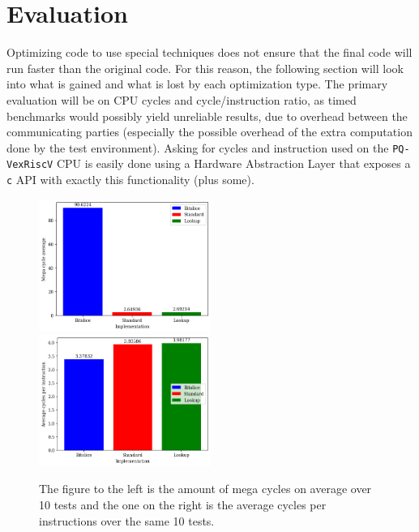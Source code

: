 \section{Evaluation} \label{evalsec}
Optimizing code to use special techniques does not ensure that the final code will run faster than the original code. For this reason, the following section will look into what is gained and what is lost by each optimization type. The primary evaluation will be on CPU cycles and cycle/instruction ratio, as timed benchmarks would possibly yield unreliable results, due to overhead between the communicating parties (especially the possible overhead of the extra computation done by the test environment). Asking for cycles and instruction used on the \texttt{PQ-VexRiscV} CPU is easily done using a Hardware Abstraction Layer that exposes a \texttt{c} API with exactly this functionality (plus some).
\begin{figure}[t]
    \includegraphics[width=0.5\textwidth]{resources/bar_avg_cycle.png}
    \includegraphics[width=0.5\textwidth]{resources/bar_avg_ratio.png}
    \caption{The figure to the left is the amount of mega cycles on average over 10 tests and the one on the right is the average cycles per instructions over the same 10 tests.}
    \label{eval:cycle}
\end{figure}
